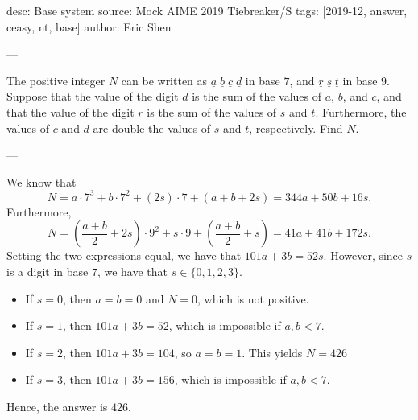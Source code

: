 desc: Base system
source: Mock AIME 2019 Tiebreaker/S
tags: [2019-12, answer, ceasy, nt, base]
author: Eric Shen

---

The positive integer $N$ can be written as $\underline a\;\underline b\;\underline c\;\underline d$ in base $7$, and $\underline r\;\underline s\;\underline t$ in base $9$. Suppose that the value of the digit $d$ is the sum of the values of $a$, $b$, and $c$, and that the value of the digit $r$ is the sum of the values of $s$ and $t$. Furthermore, the values of $c$ and $d$ are double the values of $s$ and $t$, respectively. Find $N$.

---

We know that \[N=a\cdot 7^3+b\cdot 7^2+(2s)\cdot 7+(a+b+2s)=344a+50b+16s.\]
Furthermore, \[N=\left(\frac{a+b}2+2s\right)\cdot 9^2+s\cdot 9+\left(\frac{a+b}2+s\right)=41a+41b+172s.\]
Setting the two expressions equal, we have that $101a+3b=52s$. However, since $s$ is a digit in base $7$, we have that $s\in\{0,1,2,3\}$.
\begin{itemize}[itemsep=0em]
    \item If $s=0$, then $a=b=0$ and $N=0$, which is not positive.
    \item If $s=1$, then $101a+3b=52$, which is impossible if $a,b<7$.
    \item If $s=2$, then $101a+3b=104$, so $a=b=1$. This yields $N=426$
    \item If $s=3$, then $101a+3b=156$, which is impossible if $a,b<7$.
\end{itemize}
Hence, the answer is $426$.
